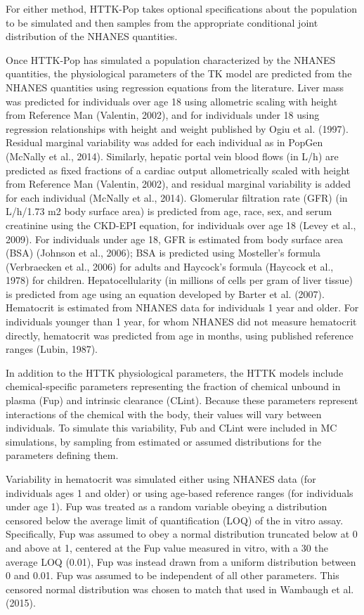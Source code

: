 \documentclass[a4paper]{book}
\begin{document}
\begin{Details}
For either method, HTTK-Pop
takes optional specifications about the population to be simulated
and then samples from the appropriate conditional joint
distribution of the NHANES quantities.

Once HTTK-Pop has simulated a population characterized by the
NHANES quantities, the physiological parameters of the TK model
are predicted from the NHANES quantities using regression
equations from the literature. Liver mass was predicted for individuals
over age 18 using allometric scaling with height from Reference Man
(Valentin, 2002), and for individuals under 18 using regression relationships
with height and weight published by Ogiu et al. (1997).
Residual marginal variability was added for each individual as in
PopGen (McNally et al., 2014). Similarly, hepatic portal vein blood
flows (in L/h) are predicted as fixed fractions of a cardiac output allometrically
scaled with height from Reference Man (Valentin, 2002),
and residual marginal variability is added for each individual (McNally
et al., 2014). Glomerular filtration rate (GFR) (in L/h/1.73 m2 body
surface area) is predicted from age, race, sex, and serum creatinine
using the CKD-EPI equation, for individuals over age 18 (Levey et al.,
2009). For individuals under age 18, GFR is estimated from body surface
area (BSA) (Johnson et al., 2006); BSA is predicted using Mosteller's
formula (Verbraecken et al., 2006) for adults and Haycock's
formula (Haycock et al., 1978) for children. Hepatocellularity (in millions
of cells per gram of liver tissue) is predicted from age using an
equation developed by Barter et al. (2007). Hematocrit is estimated
from NHANES data for individuals 1 year and older. For individuals
younger than 1 year, for whom NHANES did not measure hematocrit
directly, hematocrit was predicted from age in months, using published
reference ranges (Lubin, 1987).

In addition to the HTTK physiological parameters, the HTTK models
include chemical-specific parameters representing the fraction of chemical
unbound in plasma (Fup) and intrinsic clearance (CLint). Because
these parameters represent interactions of the chemical with the body,
their values will vary between individuals. To simulate this variability,
Fub and CLint were included in MC simulations, by sampling from estimated
or assumed distributions for the parameters defining them.

Variability in hematocrit was simulated either using NHANES data
(for individuals ages 1 and older) or using age-based reference ranges
(for individuals under age 1). Fup was treated as a random variable
obeying a distribution censored below the average limit of quantification
(LOQ) of the in vitro assay. Specifically, Fup was assumed to obey a
normal distribution truncated below at 0 and above at 1, centered at the
Fup value measured in vitro, with a 30
the average LOQ (0.01), Fup was instead drawn from a uniform distribution
between 0 and 0.01. Fup was assumed to be independent of all
other parameters. This censored normal distribution was chosen to
match that used in Wambaugh et al. (2015).


\end{Details}
\end{document}
